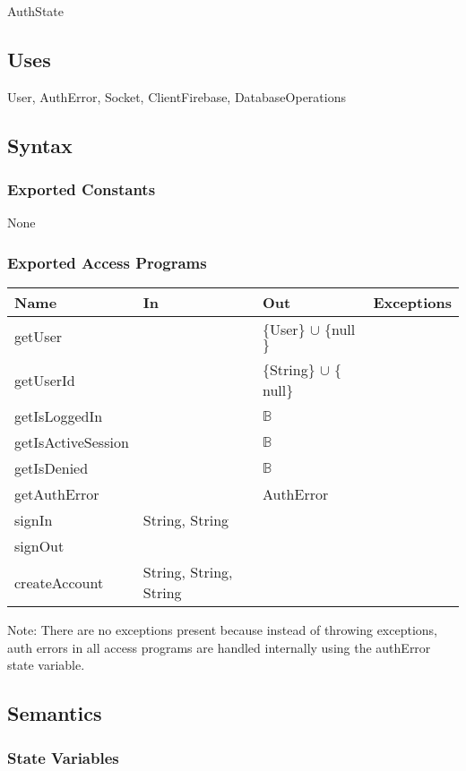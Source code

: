 \documentclass[12pt, titlepage]{article}
\begin{document}
AuthState

\subsection{Uses}

User, AuthError, Socket, ClientFirebase, DatabaseOperations

\subsection{Syntax}

\subsubsection{Exported Constants}
None
\subsubsection{Exported Access Programs}

\begin{center}
\begin{tabular}{p{4cm} p{4cm} p{4cm} p{2cm}}
\hline
\textbf{Name} & \textbf{In} & \textbf{Out} & \textbf{Exceptions} \\
\hline
getUser &  & $\{$User$\}$ $\cup$ $\{$null$\}$ &  \\ \hline
getUserId &  & $\{$String$\}$ $\cup$ $\{$null$\}$ &  \\ \hline
getIsLoggedIn &  & $\mathbb{B}$ &  \\ \hline
getIsActiveSession &  & $\mathbb{B}$ &  \\ \hline
getIsDenied &  & $\mathbb{B}$ &  \\ \hline
getAuthError &  & AuthError &  \\ \hline
signIn & String, String &  &  \\ \hline
signOut & &  &  \\ \hline
createAccount & String, String, String &  &  \\ \hline
\end{tabular}
\end{center}
Note: There are no exceptions present because instead of throwing exceptions, auth errors in all access programs are handled internally using the authError state variable.
\subsection{Semantics}

\subsubsection{State Variables}
\end{document}
